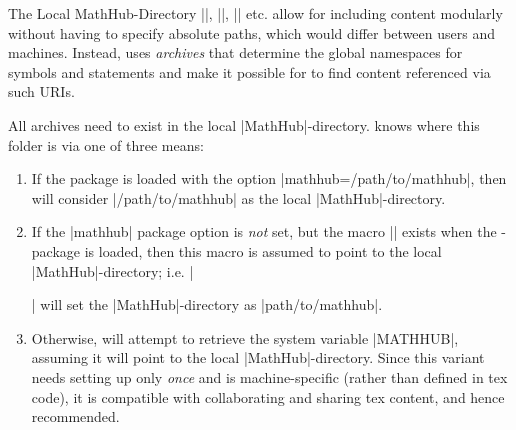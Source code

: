 \begin{omgroup}{The Local MathHub-Directory}
    |\usemodule|, |\importmodule|, || etc. allow for 
    including content modularly without having to specify absolute
    paths, which would differ between users and machines. Instead,
    \sTeX uses \emph{archives} that determine the global
    namespaces for symbols and statements and make it possible
    for \sTeX to find content referenced via such URIs.

    All \sTeX archives need to exist in the local |MathHub|-directory.
    \sTeX knows where this folder is via one of three means:

    \begin{enumerate}
        \item If the \sTeX package is loaded with the option
            |mathhub=/path/to/mathhub|, then \sTeX will consider
            |/path/to/mathhub| as the local |MathHub|-directory.
        \item If the |mathhub| package option is \emph{not}
            set, but the macro |\mathhub| exists when the
            \sTeX-package is loaded, then this macro is
            assumed to point to the local |MathHub|-directory; i.e.
            |\def\mathhub{/path/to/mathhub}\usepackage{stex}|
            will set the |MathHub|-directory as |path/to/mathhub|.
        \item Otherwise, \sTeX will attempt to retrieve the
            system variable |MATHHUB|, assuming it will
            point to the local |MathHub|-directory. Since this
            variant needs setting up only \emph{once} and is 
            machine-specific (rather than defined in tex code), 
            it is compatible with collaborating and sharing tex 
            content, and hence recommended.
    \end{enumerate}
\end{omgroup}

